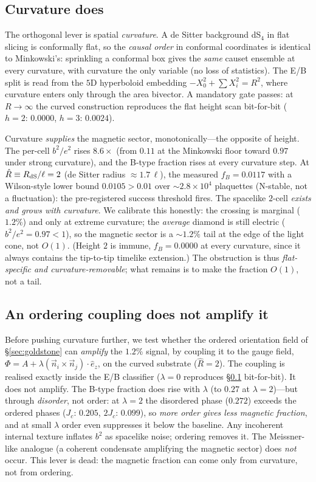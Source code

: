 \documentclass[aps,prd,reprint,nofootinbib,superscriptaddress,floatfix]{revtex4-2}
\newcommand{\Rhat}{\hat R}
\newcommand{\fracB}{f_{\!B}}
\begin{document}
\subsection{Curvature does}\label{sec:curvature}
The orthogonal lever is spatial \emph{curvature}. A de Sitter background dS$_4$ in flat
slicing is conformally flat, so the \emph{causal order} in conformal coordinates is
identical to Minkowski's: sprinkling a conformal box gives the \emph{same} causet
ensemble at every curvature, with curvature the only variable (no loss of statistics).
The E/B split is read from the $5$D hyperboloid embedding $-X_0^2+\sum X_i^2=R^2$, where
curvature enters only through the area bivector. A mandatory gate passes: at $R\to\infty$
the curved construction reproduces the flat height scan bit-for-bit
($h{=}2{:}\,0.0000$, $h{=}3{:}\,0.0024$).

Curvature \emph{supplies} the magnetic sector, monotonically---the opposite of height.
The per-cell $b^2/e^2$ rises $8.6\times$ (from $0.11$ at the Minkowski floor toward $0.97$
under strong curvature), and the B-type fraction rises at every curvature step. At
$\Rhat\equiv R_{\rm dS}/\ell=2$ (de Sitter radius $\approx1.7\,\ell$), the measured
$\fracB=0.0117$ with a Wilson-style lower bound $0.0105>0.01$ over $\sim2.8\times10^4$
plaquettes (N-stable, not a fluctuation): the pre-registered success threshold fires.
The spacelike $2$-cell \emph{exists and grows with curvature}. We calibrate this
honestly: the crossing is marginal ($1.2\%$) and only at extreme curvature; the
\emph{average} diamond is still electric ($b^2/e^2=0.97<1$), so the magnetic sector is a
$\sim1.2\%$ tail at the edge of the light cone, not $O(1)$. (Height $2$ is immune,
$\fracB=0.0000$ at every curvature, since it always contains the tip-to-tip timelike
extension.) The obstruction is thus \emph{flat-specific and curvature-removable}; what
remains is to make the fraction $O(1)$, not a tail.

\subsection{An ordering coupling does not amplify it}\label{sec:coupling}
Before pushing curvature further, we test whether the ordered orientation field of
\S\ref{sec:goldstone} can \emph{amplify} the $1.2\%$ signal, by coupling it to the gauge
field, $\Phi=A+\lambda(\vec n_i\times\vec n_j)\!\cdot\!\hat e_z$, on the curved substrate
($\Rhat=2$). The coupling is realised exactly inside the E/B classifier ($\lambda=0$
reproduces \S\ref{sec:curvature} bit-for-bit). It does not amplify. The B-type fraction
does rise with $\lambda$ (to $0.27$ at $\lambda=2$)---but through \emph{disorder}, not
order: at $\lambda=2$ the disordered phase ($0.272$) exceeds the ordered phases
($J_c{:}\,0.205$, $2J_c{:}\,0.099$), so \emph{more order gives less magnetic fraction},
and at small $\lambda$ order even suppresses it below the baseline. Any incoherent
internal texture inflates $b^2$ as spacelike noise; ordering removes it. The Meissner-
like analogue (a coherent condensate amplifying the magnetic sector) does \emph{not}
occur. This lever is dead: the magnetic fraction can come only from curvature, not from
ordering.
\end{document}
